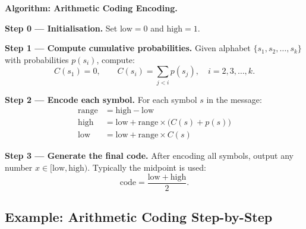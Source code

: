 \begin{definitionbox}
\textbf{Algorithm: Arithmetic Coding Encoding.}

\textbf{Step 0 — Initialisation.}
Set $\mathrm{low} = 0$ and $\mathrm{high} = 1$.

\medskip
\textbf{Step 1 — Compute cumulative probabilities.}
Given alphabet $\{s_1, s_2, \ldots, s_k\}$ with probabilities $p(s_i)$,
compute:
\[
  C(s_1) = 0, \qquad C(s_i) = \sum_{j < i} p(s_j), \quad i = 2, 3, \ldots, k.
\]

\textbf{Step 2 — Encode each symbol.}
For each symbol $s$ in the message:
\begin{align*}
  \mathrm{range} &= \mathrm{high} - \mathrm{low} \\
  \mathrm{high}  &= \mathrm{low} + \mathrm{range} \times \bigl(C(s) + p(s)\bigr) \\
  \mathrm{low}   &= \mathrm{low} + \mathrm{range} \times C(s)
\end{align*}

\textbf{Step 3 — Generate the final code.}
After encoding all symbols, output any number $x \in [\mathrm{low},
\mathrm{high})$. Typically the midpoint is used:
\[
  \mathrm{code} = \frac{\mathrm{low} + \mathrm{high}}{2}.
\]
\end{definitionbox}

\subsection{Example: Arithmetic Coding Step-by-Step}

